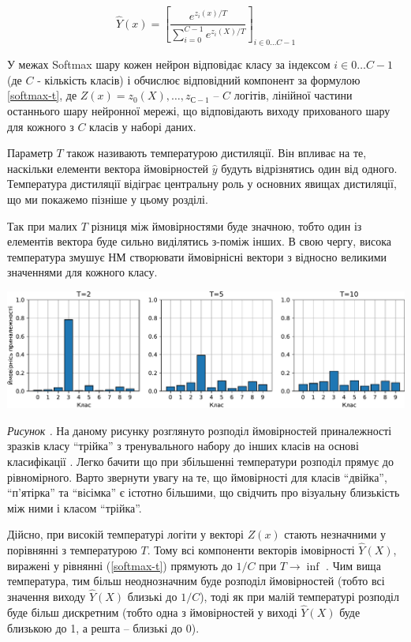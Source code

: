 \documentclass[14pt,a4paper]{extarticle}
\newcounter{e}
\newcounter{pic}
\newcommand{\pic}[1]{\refstepcounter{pic} \vspace{-0.3cm}\textit{Рисунок \arabic{pic}\label{#1}.}}
\numberwithin{equation}{section}
\numberwithin{figure}{section}
\begin{document}
 \begin{equation}
 \label{softmax-t}
 \hat{Y}(x)=\left[\frac{e^{z_{i}(x) / T}}{\sum\limits_{i=0}^{C-1} e^{z_{i}(X) / T}}\right]_{i \in 0 \dots C-1}
 \end{equation}

 У межах Softmax шару кожен нейрон відповідає класу за індексом $i \in 0 \dots C-1$ (де $C$ - кількість класів) і обчислює відповідний компонент за формулою \ref{softmax-t}, де $Z(x) = z_0(X), \dots , z_{С-1}$ -- $C$ логітів, лінійної частини останнього шару нейронної мережі, що відповідають виходу прихованого шару для кожного з $C$ класів у наборі даних.
 
 Параметр $T$ також називають температурою дистиляції. Він впливає на те, наскільки елементи вектора ймовірностей $\hat{y}$ будуть відрізнятись один від одного. Температура дистиляції відіграє центральну роль у основних явищах дистиляції, що ми покажемо пізніше у цьому розділі.

 Так при малих $T$ різниця між ймовірностями буде значною, тобто один із елементів вектора буде сильно виділятись з-поміж інших. В свою чергу, висока температура змушує НМ створювати ймовірнісні вектори з відносно великими значеннями для кожного класу.
 
 \begin{center}
 	\includegraphics[width=17cm]{../images/TvsP.pdf}
 \end{center}
 \begin{center}
 	\pic{distilation} На даному рисунку розглянуто розподіл ймовірностей приналежності зразків класу ``трійка'' з тренувального набору до інших класів на основі класифікації . Легко бачити що при збільшенні температури розподіл прямує до рівномірного. Варто звернути увагу на те, що ймовірності для класів ``двійка'', ``п'ятірка'' та ``вісімка'' є істотно більшими, що свідчить про візуальну близькість між ними і класом ``трійка''.
 \end{center}
 
 Дійсно, при високій температурі логіти у векторі $Z(x)$ стають незначними у порівнянні з температурою $T$. Тому всі компоненти векторів імовірності $\hat{Y}(X)$, виражені у рівнянні (\ref{softmax-t}) прямують до $1/C$ при $T \to \inf$ . Чим вища температура, тим більш неоднозначним буде розподіл ймовірностей (тобто всі значення виходу $\hat{Y}(X)$ близькі до $1/C$), тоді як
 при малій температурі розподіл буде більш дискретним (тобто одна з ймовірностей у виході $\hat{Y}(X)$ буде близькою до 1, а решта -- близькі до 0).
 
\end{document}

